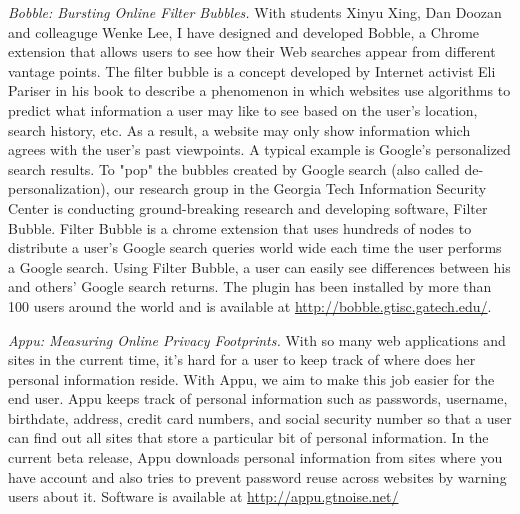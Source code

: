 \begin{pub}
\item {\em Bobble: Bursting Online Filter Bubbles.} With students Xinyu
  Xing, Dan Doozan and colleaguge Wenke Lee, I have designed and
  developed Bobble, a Chrome extension that allows users to see how
  their Web searches appear from different vantage points.  The filter
  bubble is a concept developed by Internet activist Eli Pariser in his
  book to describe a phenomenon in which websites use algorithms to
  predict what information a user may like to see based on the user's
  location, search history, etc. As a result, a website may only show
  information which agrees with the user's past viewpoints. A typical
  example is Google's personalized search results. To "pop" the bubbles
  created by Google search (also called de-personalization), our
  research group in the Georgia Tech Information Security Center is
  conducting ground-breaking research and developing software, Filter
  Bubble. Filter Bubble is a chrome extension that uses hundreds of
  nodes to distribute a user's Google search queries world wide each
  time the user performs a Google search. Using Filter Bubble, a user
  can easily see differences between his and others' Google search
  returns.  The plugin has been installed by more than 100 users around
  the world and is available at \url{http://bobble.gtisc.gatech.edu/}.

\item {\em Appu: Measuring Online Privacy Footprints.}  With so many web
  applications and sites in the current time, it's hard for a user to
  keep track of where does her personal information reside. With Appu,
  we aim to make this job easier for the end user. Appu keeps track of
  personal information such as passwords, username, birthdate, address,
  credit card numbers, and social security number so that a user can
  find out all sites that store a particular bit of personal
  information.  In the current beta release, Appu downloads personal
  information from sites where you have account and also tries to
  prevent password reuse across websites by warning users about
  it. Software is available at \url{http://appu.gtnoise.net/}


\end{pub}
